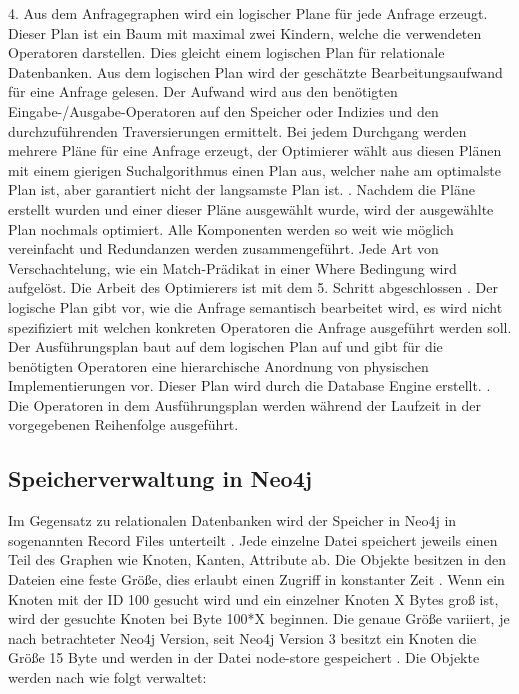 4. Aus dem Anfragegraphen wird ein logischer Plane für jede Anfrage erzeugt. Dieser Plan ist ein Baum mit maximal zwei Kindern, welche die verwendeten Operatoren darstellen. Dies gleicht einem logischen Plan für relationale Datenbanken. Aus dem logischen Plan wird der geschätzte Bearbeitungsaufwand für eine Anfrage gelesen. Der Aufwand wird aus den benötigten Eingabe-/Ausgabe-Operatoren auf den Speicher oder Indizies und den durchzuführenden Traversierungen ermittelt. Bei jedem Durchgang werden mehrere Pläne für eine Anfrage erzeugt, der Optimierer wählt aus diesen Plänen mit einem gierigen Suchalgorithmus einen Plan aus, welcher nahe am optimalste Plan ist, aber garantiert nicht der langsamste Plan ist. \newline {}. Nachdem die Pläne erstellt wurden und einer dieser Pläne ausgewählt wurde, wird der ausgewählte Plan nochmals optimiert. Alle Komponenten werden so weit wie möglich vereinfacht und Redundanzen werden zusammengeführt. Jede Art von Verschachtelung, wie ein Match-Prädikat in einer Where Bedingung wird aufgelöst. Die Arbeit des Optimierers ist mit dem 5. Schritt abgeschlossen \newline {}. Der logische Plan gibt vor, wie die Anfrage semantisch bearbeitet wird, es wird nicht spezifiziert mit welchen konkreten Operatoren die Anfrage ausgeführt werden soll. Der Ausführungsplan baut auf dem logischen Plan auf und gibt für die benötigten Operatoren eine hierarchische Anordnung von physischen  Implementierungen vor. Dieser Plan wird durch die Database Engine erstellt.  \newline {}. Die Operatoren in dem Ausführungsplan werden während der Laufzeit in der vorgegebenen Reihenfolge ausgeführt. 


\subsection{Speicherverwaltung in Neo4j}
Im Gegensatz zu relationalen Datenbanken wird der Speicher in Neo4j in sogenannten Record Files unterteilt \parencite{angles2012comparison}. Jede einzelne Datei speichert jeweils einen Teil des Graphen wie Knoten, Kanten, Attribute ab. Die Objekte besitzen in den Dateien eine feste Größe, dies erlaubt einen Zugriff in konstanter Zeit \parencite{robinson2013graph}. Wenn ein Knoten mit der ID 100 gesucht wird und ein einzelner Knoten X Bytes groß ist, wird der gesuchte Knoten bei Byte 100*X beginnen. Die genaue Größe  variiert, je nach betrachteter Neo4j Version, seit Neo4j Version 3 besitzt ein Knoten die Größe 15 Byte und werden in der Datei node-store gespeichert \parencite{Storage}. Die Objekte werden nach \parencite{robinson2013graph} wie folgt verwaltet:
